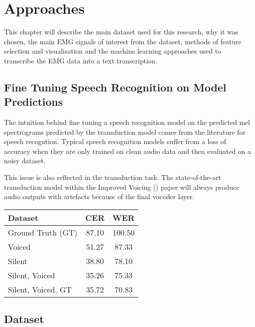 \chapter{Approaches} \label{chap:approaches}

This chapter will describe the main dataset used for this research, why it was chosen,
the main EMG signals of interest from the dataset, methods of feature selection and
visualisation and the machine learning approaches used to transcribe the EMG data
into a text transcription.

\section{Fine Tuning Speech Recognition on Model Predictions}

The intuition behind fine tuning a speech recognition model on the
predicted mel spectrograms predicted by the transduction model comes
from the literature for speech recogntion. Typical speech recognition models
suffer from a loss of accuracy when they are only trained on clean audio data
and then evaluated on a noisy dataset.

This issue is also reflected in the transduction task. The state-of-the-art
transduction model within the Improved Voicing (\cite{gaddy2021improved}) paper
will always produce audio outputs with artefacts because of the final vocoder layer.

{\small\begin{center}
\begin{tabular} { | l | c | c | }
\hline
Dataset & CER & WER \\
\hline
Ground Truth (GT) & 87.10 & 100.50 \\
Voiced & 51.27 & 87.33 \\
Silent & 38.80 & 78.10 \\
Silent, Voiced & 35.26 & 75.33 \\
Silent, Voiced, GT & 35.72 & 70.83 \\
\hline
\end{tabular}
\end{center}}

\iffalse

\section{Dataset}

